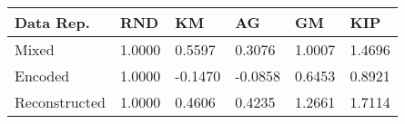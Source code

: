 \begin{tabular}{llllll}
\toprule
Data Rep. & RND & KM & AG & GM & KIP \\
\midrule
Mixed & 1.0000 & 0.5597 & 0.3076 & 1.0007 & 1.4696 \\
Encoded & 1.0000 & -0.1470 & -0.0858 & 0.6453 & 0.8921 \\
Reconstructed & 1.0000 & 0.4606 & 0.4235 & 1.2661 & 1.7114 \\
\bottomrule
\end{tabular}
